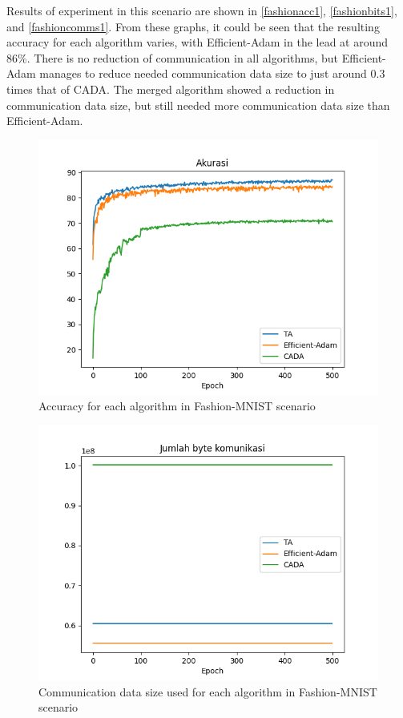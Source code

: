 Results of experiment in this scenario are shown in \autoref{fashionacc1}, \autoref{fashionbits1}, and \autoref{fashioncomms1}. From these graphs, it could be seen that the resulting accuracy for each algorithm varies, with Efficient-Adam in the lead at around 86\%. There is no reduction of communication in all algorithms, but Efficient-Adam manages to reduce needed communication data size to just around 0.3 times that of CADA. The merged algorithm showed a reduction in communication data size, but still needed more communication data size than Efficient-Adam.

\begin{figure}[htbp]
  \centering
  \includegraphics[width=0.8\columnwidth]{resources/fashion_acc.png}
  \caption{\label{fashionacc1}Accuracy for each algorithm in Fashion-MNIST scenario}
\end{figure}
\begin{figure}[htbp]
  \centering
  \includegraphics[width=0.8\columnwidth]{resources/fashion_bits.png}
  \caption{\label{fashionbits1}Communication data size used for each algorithm in Fashion-MNIST scenario}
\end{figure}
